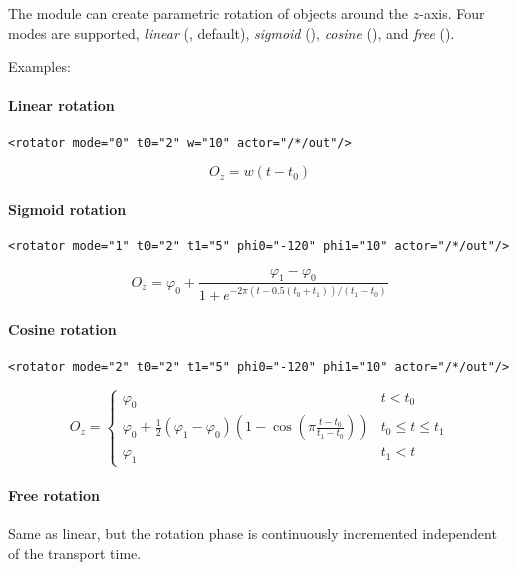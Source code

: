 The  module can create parametric rotation of objects
around the $z$-axis. Four modes are supported, {\em linear}
(, default), {\em sigmoid} (), {\em
  cosine} (), and {\em free} ().

Examples:

\paragraph{Linear rotation}

\begin{lstlisting}[numbers=none]
  <rotator mode="0" t0="2" w="10" actor="/*/out"/>
\end{lstlisting}

\begin{equation}
O_z = w (t-t_0)
\end{equation}

\paragraph{Sigmoid rotation}

\begin{lstlisting}[numbers=none]
  <rotator mode="1" t0="2" t1="5" phi0="-120" phi1="10" actor="/*/out"/>
\end{lstlisting}

\begin{equation}
O_z = \varphi_0+\frac{\varphi_1-\varphi_0}{1+e^{-2\pi (t-0.5(t_0+t_1))/(t_1-t_0)}}
\end{equation}

\paragraph{Cosine rotation}

\begin{lstlisting}[numbers=none]
  <rotator mode="2" t0="2" t1="5" phi0="-120" phi1="10" actor="/*/out"/>
\end{lstlisting}

\begin{equation}
O_z = \left\{\begin{array}{ll}
\varphi_0 & t<t_0\\
\varphi_0+\frac12(\varphi_1-\varphi_0)(1-\cos(\pi \frac{t-t_0}{t_1-t_0})) & t_0\le t \le t_1\\
\varphi_1 & t_1 < t
\end{array}\right.
\end{equation}

\paragraph{Free rotation}

Same as linear, but the rotation phase is continuously incremented
independent of the transport time.
